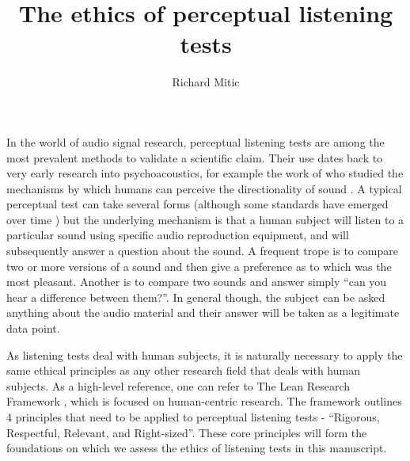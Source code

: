 \documentclass{article}
\title{The ethics of perceptual listening tests}
\author{Richard Mitic}
\begin{document}
\maketitle

In the world of audio signal research, perceptual listening tests are among the most prevalent methods to validate a scientific claim. Their use dates back to very early research into psychoacoustics, for example the work of \citeauthor{jeffressPlaceTheorySound1948} who studied the mechanisms by which humans can perceive the directionality of sound \cite{jeffressPlaceTheorySound1948}. A typical perceptual test can take several forms (although some standards have emerged over time \cite{itu-r-bs-1534_MUSHRA,itu-r-bs.1116-1MethodsSubjectiveAssessment1997}) but the underlying mechanism is that a human subject will listen to a particular sound using specific audio reproduction equipment, and will subsequently answer a question about the sound. A frequent trope is to compare two or more versions of a sound and then give a preference as to which was the most pleasant. Another is to compare two sounds and answer simply \enquote{can you hear a difference between them?}. In general though, the subject can be asked anything about the audio material and their answer will be taken as a legitimate data point.

As listening tests deal with human subjects, it is naturally necessary to apply the same ethical principles as any other research field that deals with human subjects. As a high-level reference, one can refer to The Lean Research Framework \cite{hoffeckerLeanResearchFrameworkAgust2015}, which is focused on human-centric research. The framework outlines 4 principles that need to be applied to perceptual listening tests - \enquote{Rigorous, Respectful, Relevant, and Right-sized}. These core principles will form the foundations on which we assess the ethics of listening tests in this manuscript.
\end{document}
